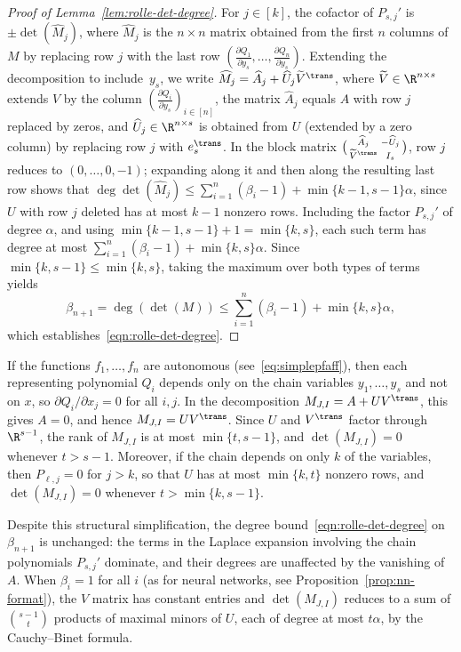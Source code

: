 \begin{proof}[Proof of Lemma~\ref{lem:rolle-det-degree}]
For $j\in [k]$, the cofactor of $P_{s,j}'$ is $\pm\det(\widehat{M}_j)$, where $\widehat{M}_j$ is the $n\times n$ matrix obtained from the first $n$ columns of $M$ by replacing row $j$ with the last row $(\frac{\partial Q_1}{\partial y_s},\dots,\frac{\partial Q_n}{\partial y_s})$. Extending the decomposition to include~$y_s$, we write $\widehat{M}_j = \widehat{A}_j + \widehat{U}_j\widetilde{V}^\trans$, where $\widetilde{V}\in \R^{n\times s}$ extends $V$ by the column $(\frac{\partial Q_i}{\partial y_s})_{i\in [n]}$, the matrix $\widehat{A}_j$ equals $A$ with row $j$ replaced by zeros, and $\widehat{U}_j\in \R^{n\times s}$ is obtained from $U$ (extended by a zero column) by replacing row $j$ with $e_s^\trans$. In the block matrix $\bigl(\begin{smallmatrix} \widehat{A}_j & -\widehat{U}_j \\ \widetilde{V}^\trans & I_s\end{smallmatrix}\bigr)$, row $j$ reduces to $(0,\dots,0,-1)$; expanding along it and then along the resulting last row shows that $\deg\det(\widehat{M}_j) \le \sum_{i=1}^n(\beta_i - 1) + \min\{k-1,s-1\}\alpha$, since $U$ with row $j$ deleted has at most $k-1$ nonzero rows. Including the factor $P_{s,j}'$ of degree $\alpha$, and using $\min\{k-1,s-1\}+1 = \min\{k,s\}$, each such term has degree at most $\sum_{i=1}^n(\beta_i-1)+\min\{k,s\}\alpha$. Since $\min\{k,s-1\} \le \min\{k,s\}$, taking the maximum over both types of terms yields
\begin{equation*}
  \beta_{n+1} = \deg(\det(M)) \le \sum_{i=1}^n (\beta_i - 1) + \min\{k, s\}\alpha,
\end{equation*}
which establishes~\eqref{eqn:rolle-det-degree}.
\end{proof}

\begin{remark}\label{rem:autonomous-rolle}
  If the functions $f_1,\dots,f_n$ are autonomous (see~\eqref{eq:simplepfaff}), then each representing polynomial $Q_i$ depends only on the chain variables $y_1,\dots,y_s$ and not on $x$, so $\partial Q_i/\partial x_j = 0$ for all $i, j$. In the decomposition $M_{J,I} = A + UV^\trans$, this gives $A = 0$, and hence $M_{J,I} = UV^\trans$. Since $U$ and $V^\trans$ factor through $\R^{s-1}$, the rank of $M_{J,I}$ is at most $\min\{t, s-1\}$, and $\det(M_{J,I}) = 0$ whenever $t > s - 1$. Moreover, if the chain depends on only $k$ of the variables, then $P_{\ell,j} = 0$ for $j > k$, so that $U$ has at most $\min\{k, t\}$ nonzero rows, and $\det(M_{J,I}) = 0$ whenever $t > \min\{k, s-1\}$.

  Despite this structural simplification, the degree bound~\eqref{eqn:rolle-det-degree} on $\beta_{n+1}$ is unchanged: the terms in the Laplace expansion involving the chain polynomials $P_{s,j}'$ dominate, and their degrees are unaffected by the vanishing of $A$. When $\beta_i = 1$ for all $i$ (as for neural networks, see Proposition~\ref{prop:nn-format}), the $V$ matrix has constant entries and $\det(M_{J,I})$ reduces to a sum of $\binom{s-1}{t}$ products of maximal minors of $U$, each of degree at most $t\alpha$, by the Cauchy--Binet formula.
\end{remark}

